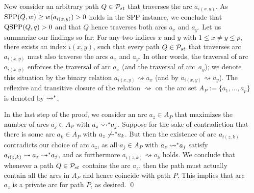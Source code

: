 Now consider an arbitrary path $Q\in{\cal P}_{st}$ that traverses the arc $a_{i(x,y)}$.
As $\text{SPP}(Q,w)\ge w(a_{i(x,y)})>0$ holds in the SPP instance, we conclude that $\text{QSPP}(Q,q)>0$ and 
that $Q$ hence traverses both arcs $a_x$ and $a_y$.
Let us summarize our findings so far:
For any two indices $x$ and $y$ with $1\le x\ne y\le p$, there exists an index $i(x,y)$,
such that every path $Q\in{\cal P}_{st}$ that traverses arc $a_{i(x,y)}$ must also traverse the 
arcs $a_x$ and $a_y$.
In other words, the traversal of arc $a_{i(x,y)}$ enforces the traversal of arc $a_x$ 
(and the traversal of arc~$a_y$); we denote this situation by the binary relation 
$a_{i(x,y)}\rightsquigarrow a_x$ (and by $a_{i(x,y)}\rightsquigarrow a_y$).
The reflexive and transitive closure of the relation $\rightsquigarrow$ on the 
arc set $A_P:=\{a_1,\ldots,a_p\}$ is denoted by $\rightsquigarrow\negthickspace^*$.

In the last step of the proof, we consider an arc $a_z\in A_P$ that maximizes the number 
of arcs $a_j\in A_P$ with $a_z\rightsquigarrow\negthickspace^* a_j$.
Suppose for the sake of contradiction that there is some arc $a_k\in A_P$ 
with $a_z\not\rightsquigarrow\negthickspace^* a_k$.
But then the existence of arc $a_{i(z,k)}$ contradicts our choice of arc $a_z$, 
as all $a_j\in A_P$ with $a_z\rightsquigarrow\negthickspace^* a_j$ 
satisfy $a_{i(z,k)}\rightsquigarrow a_z\rightsquigarrow\negthickspace^* a_j$,
and as furthermore $a_{i(z,k)}\rightsquigarrow a_k$ holds.
We conclude that whenever a path $Q\in{\cal P}_{st}$ contains the arc $a_z$, then the path
must actually contain all the arcs in $A_P$ and hence coincide with path $P$.
This implies that arc $a_z$ is a private arc for path $P$, as desired.
\qed

